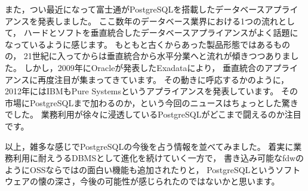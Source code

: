 また，つい最近になって富士通がPostgreSQLを搭載したデータベースアプライアンスを発表しました。
ここ数年のデータベース業界における1つの流れとして，
ハードとソフトを垂直統合したデータベースアプライアンスがよく話題になっているように感じます。
もともと古くからあった製品形態ではあるものの，
21世紀に入ってからは垂直統合から水平分業へと流れが傾きつつありました。
しかし，2009年にOracleが発表したExadataにより，
垂直統合のアプライアンスに再度注目が集まってきています。
その動きに呼応するかのように，2012年にはIBMもPure Systemsというアプライアンスを発表しています。
その市場にPostgreSQLまで加わるのか，という今回のニュースはちょっとした驚きでした。
業務利用が徐々に浸透しているPostgreSQLがどこまで闘えるのか注目です。

以上，雑多な感じでPostgreSQLの今後を占う情報を並べてみました。
着実に業務利用に耐えうるDBMSとして進化を続けていく一方で，
書き込み可能なfdwのようにOSSならではの面白い機能も追加されたりと，
PostgreSQLというソフトウェアの懐の深さ，今後の可能性が感じられたのではないかと思います。
